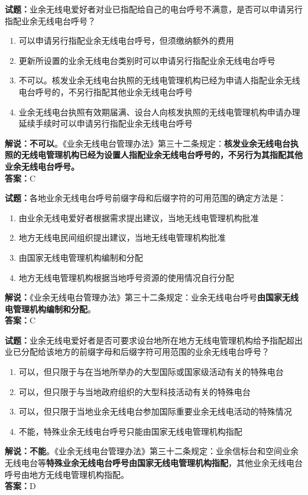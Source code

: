 \documentclass{ctexbook}
\begin{document}
\noindent\textbf{试题：}业余无线电爱好者对业已指配给自己的电台呼号不满意，是否可以申请另行指配业余无线电台呼号？
\begin{enumerate}[leftmargin=3em]
  \item 可以申请另行指配业余无线电台呼号，但须缴纳额外的费用
  \item 更新所设置的业余无线电台类别时可以申请另行指配业余无线电台呼号
  \item 不可以。核发业余无线电台执照的无线电管理机构已经为申请人指配业余无线电台呼号的，不另行指配其他业余无线电台呼号
  \item 业余无线电台执照有效期届满、设台人向核发执照的无线电管理机构申请办理延续手续时可以申请另行指配业余无线电台呼号
\end{enumerate}
\textbf{解说：不可以}。《业余无线电台管理办法》第三十二条规定：\textbf{核发业余无线电台执照的无线电管理机构已经为设置人指配业余无线电台呼号的，不另行为其指配其他业余无线电台呼号。}\\\noindent\textbf{答案：}C

\vspace{\baselineskip}

\noindent\textbf{试题：}各地业余无线电台呼号前缀字母和后缀字符的可用范围的确定方法是：
\begin{enumerate}[leftmargin=3em]
  \item 由业余无线电爱好者根据需求提出建议，当地无线电管理机构批准
  \item 地方无线电民间组织提出建议，当地无线电管理机构批准
  \item 由国家无线电管理机构编制和分配
  \item 地方无线电管理机构根据当地呼号资源的使用情况自行分配
\end{enumerate}
\noindent\textbf{解说：}《业余无线电台管理办法》第三十二条规定：业余无线电台呼号\textbf{由国家无线电管理机构编制和分配}。\\\noindent\textbf{答案：}C

\vspace{\baselineskip}

\noindent\textbf{试题：}业余无线电爱好者是否可要求设台地所在地方无线电管理机构给予指配超出业已分配给该地方的前缀字母和后缀字符可用范围的业余无线电台呼号？
\begin{enumerate}[leftmargin=3em]
  \item 可以，但只限于与在当地所举办的大型国际或国家级活动有关的特殊电台
  \item 可以，但只限于与当地政府组织的大型科技活动有关的特殊电台
  \item 可以，但只限于当地业余无线电台参加国际重要业余无线电活动的特殊情况
  \item 不能，特殊业余无线电台呼号只能由国家无线电管理机构指配
\end{enumerate}
\textbf{解说：不能}。《业余无线电台管理办法》第三十二条规定：业余信标台和空间业余无线电台等\textbf{特殊业余无线电台呼号由国家无线电管理机构指配}，其他业余无线电台呼号由地方无线电管理机构指配。\\\noindent\textbf{答案：}D
\end{document}
